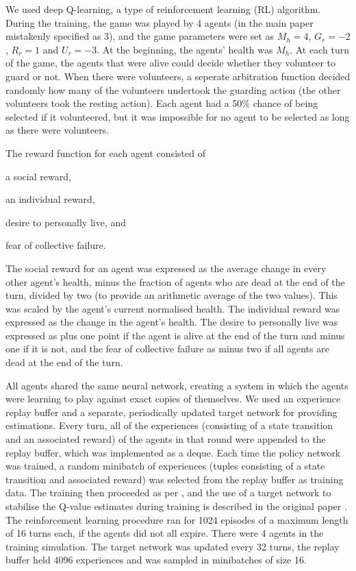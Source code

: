 We used deep Q-learning, a type of reinforcement learning (RL) algorithm.
During the training, the game was played by 4 agents (in the main paper
mistakenly specified as 3), and the game parameters were set as $M_h = 4$,
$G_r = -2$, $R_r = 1$ and $U_r = -3$.
%
At the beginning, the agents' health was $M_h$.
%
At each turn of the game, the agents that were alive could decide whether they
volunteer to guard or not. When there were volunteers, a seperate arbitration
function decided randomly how many of the volunteers undertook the guarding
action (the other volunteers took the resting action). Each agent had a 50\%
chance of being selected if it volunteered, but it was impossible for no agent
to be selected as long as there were volunteers.

The reward function for each agent consisted of
\begin{inparaenum}[\it (i)]
\item  a social reward,
\item an individual reward,
\item desire to personally live, and
\item fear of collective failure.
\end{inparaenum}
The social reward for an agent was expressed as the average change in every
other agent's health, minus the fraction of agents who are dead at the end of
the turn, divided by two (to provide an arithmetic average of the two
values). This was scaled by the agent's current normalised health. The
individual reward was expressed as the change in the agent's health. The desire
to personally live was expressed as plus one point if the agent is alive at the
end of the turn and minus one if it is not, and the fear of collective failure
as minus two if all agents are dead at the end of the turn.



All agents shared the same neural network, creating a system in which the
agents were learning to play against exact copies of themselves.
%
We used an experience replay buffer and a separate, periodically updated target
network for providing estimations.
%
Every turn, all of the experiences (consisting of a state transition and an
associated reward) of the agents in that round were appended to the replay
buffer, which was implemented as a deque. 
%
Each time the policy network was trained, a random minibatch of experiences
(tuples consisting of a state transition and associated reward) was selected
from the replay buffer as training data.
%
The training then proceeded as per \cite{Mnih+15}, and the use of a target
network to stabilise the Q-value estimates during training is described in
the original paper \cite{HaaseltGS16}.
%
The reinforcement learning procedure ran for 1024 episodes of a maximum length
of 16 turns each, if the agents did not all expire. There were 4 agents in the
training simulation. The target network was updated every 32 turns, the replay
buffer held 4096 experiences and was sampled in minibatches of size 16.

